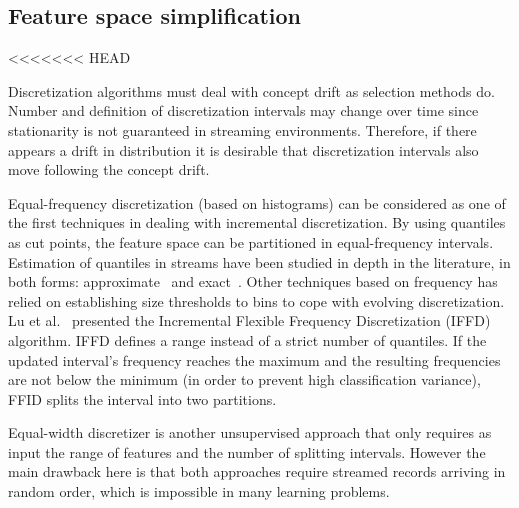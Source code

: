 \documentclass[preprint,12pt]{elsarticle}
\begin{document}
\begin{itemize}
%
%
%


\subsection{Feature space simplification}
\label{subsec:disc}
<<<<<<< HEAD

Discretization algorithms must deal with concept drift as selection methods do. Number and definition of discretization intervals may change over time since stationarity is not guaranteed in streaming environments. Therefore, if there appears a drift in distribution it is desirable that discretization intervals also move following the concept drift.

Equal-frequency discretization (based on histograms) can be considered as one of the first techniques in dealing with incremental discretization. By using quantiles as cut points, the feature space can be partitioned in equal-frequency intervals. Estimation of quantiles in streams have been studied in depth in the literature, in both forms: approximate~\cite{ben10, webb14} and exact~\cite{gupta03, guha09}. Other techniques based on frequency has relied on establishing size thresholds to bins to cope with evolving discretization. Lu et al.~\cite{lu06} presented the Incremental Flexible Frequency Discretization (IFFD) algorithm. IFFD defines a range instead of a strict number of quantiles. If the updated interval's frequency reaches the maximum and the resulting frequencies are not below the minimum (in order to prevent high classification variance), FFID splits the interval into two partitions.

Equal-width discretizer is another unsupervised approach that only requires as input the range of features and the number of splitting intervals. However the main drawback here is that both approaches require streamed records arriving in random order, which is impossible in many learning problems.  


\end{itemize}
\end{document}
